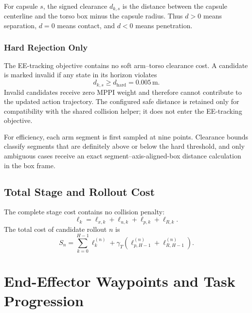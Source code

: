 \documentclass[11pt,a4paper]{article}
\begin{document}
For capsule $s$, the signed clearance $d_{k,s}$ is the distance between the
capsule centerline and the torso box minus the capsule radius. Thus $d>0$
means separation, $d=0$ means contact, and $d<0$ means penetration.

\subsubsection{Hard Rejection Only}

The EE-tracking objective contains no soft arm--torso clearance cost. A
candidate is marked invalid if any state in its horizon violates
\begin{equation}
  d_{k,s}\geq d_{\mathrm{hard}}=0.005\,\mathrm{m}.
\end{equation}
Invalid candidates receive zero MPPI weight and therefore cannot contribute
to the updated action trajectory. The configured safe distance is retained
only for compatibility with the shared collision helper; it does not enter
the EE-tracking objective.

For efficiency, each arm segment is first sampled at nine points. Clearance
bounds classify segments that are definitely above or below the hard
threshold, and only ambiguous cases receive an exact
segment--axis-aligned-box distance calculation in the box frame.

\subsection{Total Stage and Rollout Cost}

The complete stage cost contains no collision penalty:
\begin{equation}
  \ell_k=
  \ell_{x,k}+\ell_{u,k}+\ell_{p,k}+\ell_{R,k}.
\end{equation}
The total cost of candidate rollout $n$ is
\begin{equation}
  \boxed{
  S_n=
  \sum_{k=0}^{H-1}\ell_k^{(n)}
  +\gamma_T\left(
    \ell_{p,H-1}^{(n)}+\ell_{R,H-1}^{(n)}
  \right).
  }
\end{equation}

\section{End-Effector Waypoints and Task Progression}
\end{document}
